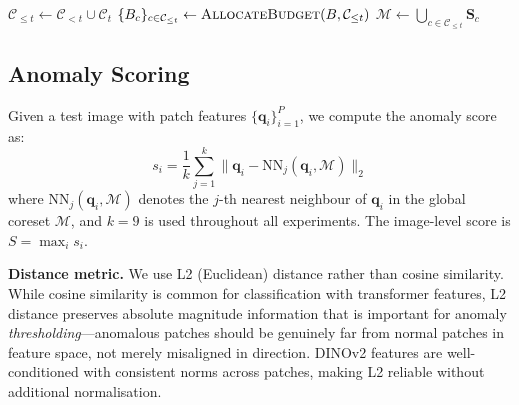 \documentclass[conference]{IEEEtran}
\newcommand{\method}{MemoryAD}
\begin{document}
\begin{algorithm}[htbp]
\SetAlgoLined
{}
\BlankLine
$\mathcal{C}_{\leq t} \leftarrow \mathcal{C}_{<t} \cup \mathcal{C}_t$ 
\BlankLine
{}
$\{B_c\}_{c \in \mathcal{C}_{\leq t}} \leftarrow \textsc{AllocateBudget}(B, \mathcal{C}_{\leq t})$ \;
\BlankLine
{}
\BlankLine
{}
\BlankLine
{}
$\mathcal{M} \leftarrow \bigcup_{c \in \mathcal{C}_{\leq t}} \mathbf{S}_c$ \;
\caption{\method{} Incremental Coreset Update}
\label{alg:incremental}
\end{algorithm}

\subsection{Anomaly Scoring}

Given a test image with patch features $\{\mathbf{q}_i\}_{i=1}^P$, we compute the anomaly score as:
\begin{equation}
    s_i = \frac{1}{k} \sum_{j=1}^{k} \|\mathbf{q}_i - \text{NN}_j(\mathbf{q}_i, \mathcal{M})\|_2
\end{equation}
where $\text{NN}_j(\mathbf{q}_i, \mathcal{M})$ denotes the $j$-th nearest neighbour of $\mathbf{q}_i$ in the global coreset $\mathcal{M}$, and $k{=}9$ is used throughout all experiments. The image-level score is $S = \max_i s_i$.

\textbf{Distance metric.} We use L2 (Euclidean) distance rather than cosine similarity. While cosine similarity is common for classification with transformer features, L2 distance preserves absolute magnitude information that is important for anomaly \emph{thresholding}---anomalous patches should be genuinely far from normal patches in feature space, not merely misaligned in direction. DINOv2 features are well-conditioned with consistent norms across patches, making L2 reliable without additional normalisation.
\end{document}
